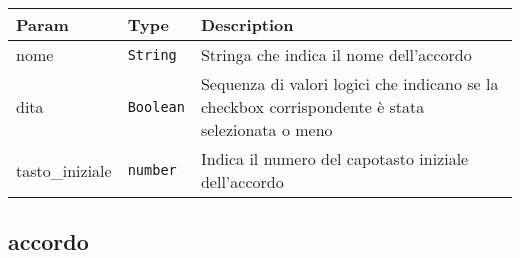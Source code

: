 \begin{tabularx}{\textwidth}{XXX}
\toprule
\begin{minipage}[b]{0.30\columnwidth}\raggedright
Param\strut
\end{minipage} & \begin{minipage}[b]{0.30\columnwidth}\raggedright
Type\strut
\end{minipage} & \begin{minipage}[b]{0.30\columnwidth}\raggedright
Description\strut
\end{minipage}\tabularnewline
\midrule
\endhead
\begin{minipage}[t]{0.30\columnwidth}\raggedright
nome\strut
\end{minipage} & \begin{minipage}[t]{0.30\columnwidth}\raggedright
\texttt{String}\strut
\end{minipage} & \begin{minipage}[t]{0.30\columnwidth}\raggedright
Stringa che indica il nome dell'accordo\strut
\end{minipage}\tabularnewline
\begin{minipage}[t]{0.30\columnwidth}\raggedright
dita\strut
\end{minipage} & \begin{minipage}[t]{0.30\columnwidth}\raggedright
\texttt{Boolean}\strut
\end{minipage} & \begin{minipage}[t]{0.30\columnwidth}\raggedright
Sequenza di valori logici che indicano se la checkbox corrispondente è
stata selezionata o meno\strut
\end{minipage}\tabularnewline
\begin{minipage}[t]{0.30\columnwidth}\raggedright
tasto\_iniziale\strut
\end{minipage} & \begin{minipage}[t]{0.30\columnwidth}\raggedright
\texttt{number}\strut
\end{minipage} & \begin{minipage}[t]{0.30\columnwidth}\raggedright
Indica il numero del capotasto iniziale dell'accordo\strut
\end{minipage}\tabularnewline
\bottomrule
\end{tabularx}

\protect\hypertarget{accordo}{}{}

\hypertarget{accordo-1}{%
\subsection{accordo}\label{accordo-1}}

